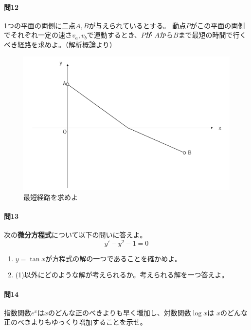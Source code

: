 \documentclass[a4j,dvipdfmx]{jsarticle}
\begin{document}
            \paragraph{問12}1つの平面の両側に二点$A,B$が与えられているとする。
            動点$P$がこの平面の両側でそれぞれ一定の速さ$v_a,v_b$で運動するとき、$P$が
            $A$から$B$まで最短の時間で行くべき経路を求めよ。（解析概論より）
            \begin{figure}[h]
                \centering
                \includegraphics[scale=0.3]{img/QuuNote/snellQuestion.png}
                \caption{最短経路を求めよ}
            \end{figure}

            \paragraph{問13}次の\textbf{微分方程式}について以下の問いに答えよ。
                \begin{equation*}
                    y'-y^2-1=0
                \end{equation*}
                \begin{enumerate}\renewcommand{\labelenumi}{(\arabic{enumi})}
                    \item $y=\tan x$が方程式の解の一つであることを確かめよ。
                    \item (1)以外にどのような解が考えられるか。考えられる解を一つ答えよ。
                \end{enumerate}
            
            \paragraph{問14}指数関数$e^x$は$x$のどんな正のべきよりも早く増加し、対数関数$\log x$は
            $x$のどんな正のべきよりもゆっくり増加することを示せ。   
            
\end{document}
